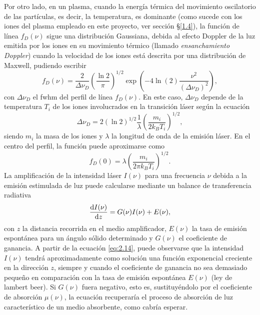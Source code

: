 Por otro lado, en un plasma, cuando la energía térmica del movimiento oscilatorio de las partículas, es decir, la temperatura, es dominante (como sucede con los iones del plasma empleado en este proyecto, ver sección \S\ref{1.4}), la función de línea $f_{D}(\nu)$ sigue una distribución Gaussiana, debida al efecto Doppler de la luz emitida por los iones en su movimiento térmico (llamado \emph{ensanchamiento Doppler})  cuando la velocidad de los iones está descrita por una distribución de Maxwell, pudiendo escribir \autocite{Tallents2003,Milonni1988,Oliva2010}
\begin{equation}\label{eq:2.11}
f_{D}(\nu) = \frac{2}{\Delta \nu_{D}} \left(\frac{\ln 2}{\pi}\right)^{1/2} \exp \left(-4 \ln(2) \frac{\nu^{2}}{(\Delta \nu_{D})^{2}}\right),
\end{equation}
con $\Delta \nu_{D}$ el \acrshort{fwhm} del perfil de línea $f_{D}(\nu)$. En este caso, $\Delta \nu_{D}$ depende de la temperatura $T_{i}$ de los iones involucrados en la transición láser según la ecuación
\begin{equation}\label{eq:2.12}
  \Delta \nu_{D} = 2(\ln 2)^{1/2} \frac{1}{\lambda}\left(\frac{m_{i}}{2k_{B}T_{i}}\right)^{1/2},
\end{equation}
siendo $m_{i}$ la masa de los iones y $\lambda$ la longitud de onda de la emisión láser. En el centro del perfil, la función puede aproximarse como
\begin{equation}\label{eq:2.13}
  f_{D}(0) = \lambda \left(\frac{m_{i}}{2 \pi k_{B}T_{i}}\right)^{1/2}.
\end{equation}
La amplificación de la intensidad láser $I(\nu)$ para una frecuencia $\nu$ debida a la emisión estimulada de luz puede calcularse mediante un balance de transferencia radiativa \autocite{Milonni1988}
\begin{equation}\label{eq:2.14}
  \frac{\operatorname{d}\!I(\nu)}{\operatorname{d}\!z} = G(\nu)I(\nu) + E(\nu),
\end{equation}
con $z$ la distancia recorrida en el medio amplificador, $E(\nu)$ la tasa de emisión espontánea para un ángulo sólido determinado y $G(\nu)$ el coeficiente de ganancia. A partir de la ecuación \eqref{eq:2.14}, puede observarse que la intensidad $I(\nu)$ tendrá aproximadamente como solución una función exponencial creciente en la dirección $z$, siempre y cuando el coeficiente de ganancia no sea demasiado pequeño en comparación con la tasa de emisión espontánea $E(\nu)$ (ley de lambert beer). Si $G(\nu)$ fuera negativo, esto es, sustituyéndolo por el coeficiente de absorción $\mu(\nu)$, la ecuación recuperaría el proceso de absorción de luz característico de un medio absorbente, como cabría esperar.

